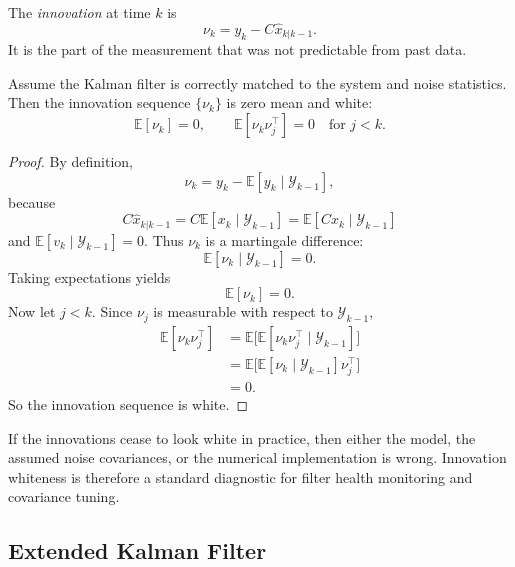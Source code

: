 \begin{definition}[Innovation]\label{def:l7-innovation}
	The \emph{innovation} at time $k$ is
	\[
		\nu_k = y_k - C\hat x_{k|k-1}.
	\]
	It is the part of the measurement that was not predictable from past data.
\end{definition}

\begin{proposition}\label{prop:l7-innovations-are-white-for-a-correctly-tuned-filter}
	Assume the Kalman filter is correctly matched to the system and noise statistics. Then the innovation sequence $\{\nu_k\}$ is zero mean and white:
	\[
		\mathbb{E}[\nu_k]=0,
		\qquad
		\mathbb{E}[\nu_k \nu_j^\top]=0 \quad \text{for } j<k.
	\]
\end{proposition}
\begin{proof}
	By definition,
	\[
		\nu_k = y_k - \mathbb{E}[y_k \mid \mathcal{Y}_{k-1}],
	\]
	because
	\[
		C\hat x_{k|k-1}=C\mathbb{E}[x_k \mid \mathcal{Y}_{k-1}]
		=
		\mathbb{E}[Cx_k \mid \mathcal{Y}_{k-1}]
	\]
	and $\mathbb{E}[v_k \mid \mathcal{Y}_{k-1}] = 0$. Thus $\nu_k$ is a martingale difference:
	\[
		\mathbb{E}[\nu_k \mid \mathcal{Y}_{k-1}] = 0.
	\]
	Taking expectations yields
	\[
		\mathbb{E}[\nu_k]=0.
	\]
	Now let $j<k$. Since $\nu_j$ is measurable with respect to $\mathcal{Y}_{k-1}$,
	\begin{align*}
		\mathbb{E}[\nu_k \nu_j^\top]
		&=
		\mathbb{E}\bigl[\mathbb{E}[\nu_k \nu_j^\top \mid \mathcal{Y}_{k-1}]\bigr] \\
		&=
		\mathbb{E}\bigl[\mathbb{E}[\nu_k \mid \mathcal{Y}_{k-1}] \nu_j^\top\bigr] \\
		&= 0.
	\end{align*}
	So the innovation sequence is white.
\end{proof}

\begin{remark}
	If the innovations cease to look white in practice, then either the model, the assumed noise covariances, or the numerical implementation is wrong. Innovation whiteness is therefore a standard diagnostic for filter health monitoring and covariance tuning.
\end{remark}

\subsection{Extended Kalman Filter}
\label{sec:l7-extended-kalman-filter}

